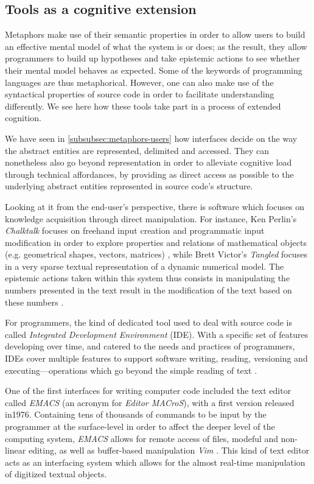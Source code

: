 \subsection{Tools as a cognitive extension}
\label{subsec:tools-cognition}

Metaphors make use of their semantic properties in order to allow users to build an effective mental model of what the system is or does; as the result, they allow programmers to build up hypotheses and take epistemic actions to see whether their mental model behaves as expected. Some of the keywords of programming languages are thus metaphorical. However, one can also make use of the syntactical properties of source code in order to facilitate understanding differently. We see here how these tools take part in a process of extended cognition.

We have seen in \autoref{subsubsec:metaphors-users} how interfaces decide on the way the abstract entities are represented, delimited and accessed. They can nonetheless also go beyond representation in order to alleviate cognitive load through technical affordances, by providing as direct access as possible to the underlying abstract entities represented in source code's structure.

Looking at it from the end-user's perspective, there is software which focuses on knowledge acquisition through direct manipulation. For instance, Ken Perlin's \emph{Chalktalk} focuses on freehand input creation and programmatic input modification in order to explore properties and relations of mathematical objects (e.g. geometrical shapes, vectors, matrices) \citep{perlin_chalktalk_2022}, while Brett Victor's \emph{Tangled} focuses in a very sparse textual representation of a dynamic numerical model. The epistemic actions taken within this system thus consists in manipulating the numbers presented in the text result in the modification of the text based on these numbers \citep{victor_tangle_2011,victor_explorable_2011}.

For programmers, the kind of dedicated tool used to deal with source code is called \emph{Integrated Development Environment} (IDE). With a specific set of features developing over time, and catered to the needs and practices of programmers, IDEs cover multiple features to support software writing, reading, versioning and executing—operations which go beyond the simple reading of text \citep{kline_evaluation_2005}.

One of the first interfaces for writing computer code included the text editor called \emph{EMACS} (an acronym for \emph{Editor MACroS}), with a first version released in1976. Containing tens of thousands of commands to be input by the programmer at the surface-level in order to affect the deeper level of the computing system, \emph{EMACS} allows for remote access of files, modeful and non-linear editing, as well as buffer-based manipulation \emph{Vim} \citep{greenberg_multics_1996}. This kind of text editor acts as an interfacing system which allows for the almost real-time manipulation of digitized textual objects.


